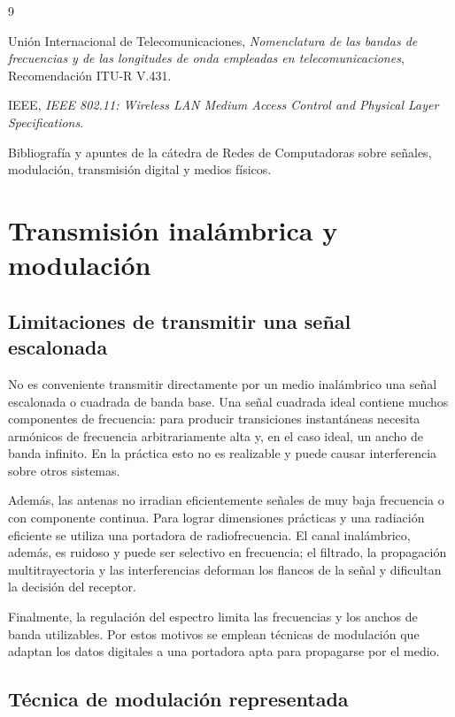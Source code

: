 ﻿\documentclass[12pt,a4paper]{article}
\begin{document}
\begin{thebibliography}{9}

Unión Internacional de Telecomunicaciones,
\emph{Nomenclatura de las bandas de frecuencias y de las longitudes de onda
empleadas en telecomunicaciones}, Recomendación ITU-R V.431.

IEEE,
\emph{IEEE 802.11: Wireless LAN Medium Access Control and Physical Layer
Specifications}.

Bibliografía y apuntes de la cátedra de Redes de Computadoras sobre señales,
modulación, transmisión digital y medios físicos.

\end{thebibliography}


\section{Transmisión inalámbrica y modulación}

\subsection{Limitaciones de transmitir una señal escalonada}

No es conveniente transmitir directamente por un medio inalámbrico una señal
escalonada o cuadrada de banda base. Una señal cuadrada ideal contiene muchos
componentes de frecuencia: para producir transiciones instantáneas necesita
armónicos de frecuencia arbitrariamente alta y, en el caso ideal, un ancho de
banda infinito. En la práctica esto no es realizable y puede causar
interferencia sobre otros sistemas.

Además, las antenas no irradian eficientemente señales de muy baja frecuencia o
con componente continua. Para lograr dimensiones prácticas y una radiación
eficiente se utiliza una portadora de radiofrecuencia. El canal inalámbrico,
además, es ruidoso y puede ser selectivo en frecuencia; el filtrado, la
propagación multitrayectoria y las interferencias deforman los flancos de la
señal y dificultan la decisión del receptor.

Finalmente, la regulación del espectro limita las frecuencias y los anchos de
banda utilizables. Por estos motivos se emplean técnicas de modulación que
adaptan los datos digitales a una portadora apta para propagarse por el medio.

\subsection{Técnica de modulación representada}
\end{document}
